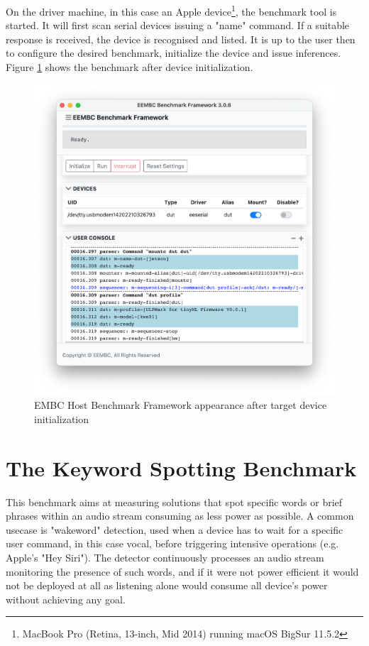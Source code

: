 \documentclass{article}
\begin{document}
On the driver machine, in this case an Apple device\footnote{MacBook Pro (Retina, 13-inch, Mid 2014) running macOS BigSur 11.5.2}, the benchmark tool is started. It will first scan serial devices issuing a "name" command. If a suitable response is received, the device is recognised and listed. It is up to the user then to configure the desired benchmark, initialize the device and issue inferences. Figure \ref{fig:embc} shows the benchmark after device initialization.
\begin{figure}[h]
    \centering
    \includegraphics[width=.8\textwidth]{assets/Screenshot 2021-08-25 at 17.34.23.png}
    \caption{EMBC Host Benchmark Framework appearance after target device initialization}
    \label{fig:embc}
\end{figure}

\section{The Keyword Spotting Benchmark}\label{kws}
This benchmark aims at measuring solutions that spot specific words or brief phrases within an audio stream consuming as less power as possible. A common usecase is "wakeword" detection, used when a device has to wait for a specific user command, in this case vocal, before triggering intensive operations (e.g. Apple's "Hey Siri"). The detector continuously processes an audio stream monitoring the presence of such words, and if it were not power efficient it would not be deployed at all as listening alone would consume all device's power without achieving any goal.
\end{document}
